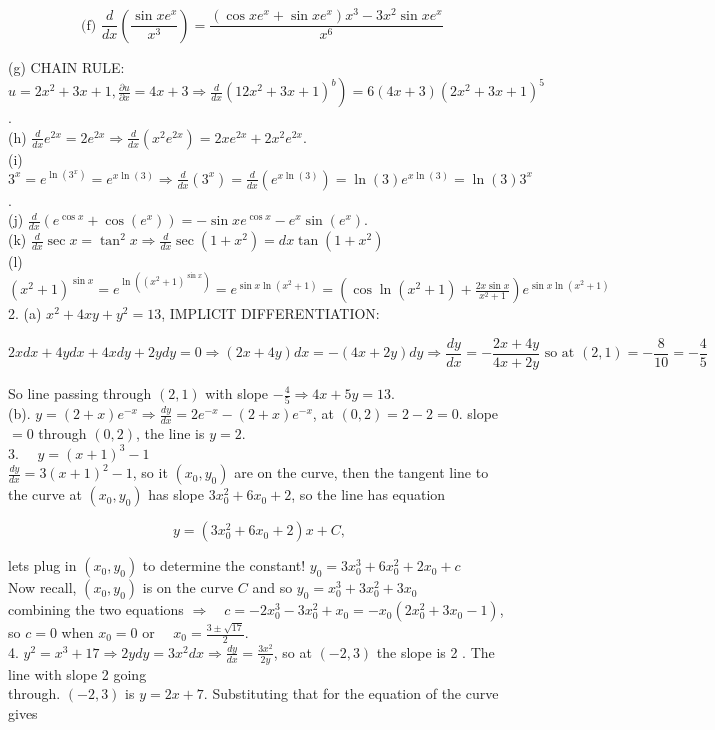 \documentclass[10pt]{article}
\begin{document}
$$
\text { (f) } \frac{d}{d x}\left(\frac{\sin x e^{x}}{x^{3}}\right)=\frac{\left(\cos x e^{x}+\sin x e^{x}\right) x^{3}-3 x^{2} \sin x e^{x}}{x^{6}}
$$

(g) CHAIN RULE: $\left.u=2 x^{2}+3 x+1, \frac{\partial u}{\partial x}=4 x+3 \Rightarrow \frac{d}{d x}\left(12 x^{2}+3 x+1\right)^{b}\right)=6(4 x+3)\left(2 x^{2}+3 x+1\right)^{5}$.\\
(h) $\frac{d}{d x} e^{2 x}=2 e^{2 x} \Rightarrow \frac{d}{d x}\left(x^{2} e^{2 x}\right)=2 x e^{2 x}+2 x^{2} e^{2 x}$.\\
(i) $3^{x}=e^{\ln \left(3^{x}\right)}=e^{x \ln (3)} \Rightarrow \frac{d}{d x}\left(3^{x}\right)=\frac{d}{d x}\left(e^{x \ln (3)}\right)=\ln (3) e^{x \ln (3)}=\ln (3) 3^{x}$.\\
(j) $\frac{d}{d x}\left(e^{\cos x}+\cos \left(e^{x}\right)\right)=-\sin x e^{\cos x}-e^{x} \sin \left(e^{x}\right)$.\\
(k) $\frac{d}{d x} \sec x=\tan ^{2} x \Rightarrow \frac{d}{d x} \sec \left(1+x^{2}\right)=d x \tan \left(1+x^{2}\right)$\\
(l) $\left(x^{2}+1\right)^{\sin x}=e^{\ln \left(\left(x^{2}+1\right)^{\sin x}\right)}=e^{\sin x \ln \left(x^{2}+1\right)}=\left(\cos \ln \left(x^{2}+1\right)+\frac{2 x \sin x}{x^{2}+1}\right) e^{\sin x \ln \left(x^{2}+1\right)}$\\
2. (a) $x^{2}+4 x y+y^{2}=13$, IMPLICIT DIFFERENTIATION:

$$
2 x d x+4 y d x+4 x d y+2 y d y=0 \Rightarrow(2 x+4 y) d x=-(4 x+2 y) d y \Rightarrow \frac{d y}{d x}=-\frac{2 x+4 y}{4 x+2 y} \text { so at }(2,1)=-\frac{8}{10}=-\frac{4}{5}
$$

So line passing through $(2,1)$ with slope $-\frac{4}{5} \Rightarrow 4 x+5 y=13$.\\
(b). $y=(2+x) e^{-x} \Rightarrow \frac{d y}{d x}=2 e^{-x}-(2+x) e^{-x}$, at $(0,2)=2-2=0$. slope $=0$ through $(0,2)$, the line is $y=2$.\\
3. $\quad y=(x+1)^{3}-1$\\
$\frac{d y}{d x}=3(x+1)^{2}-1$, so it $\left(x_{0}, y_{0}\right)$ are on the curve, then the tangent line to\\
the curve at $\left(x_{0}, y_{0}\right)$ has slope $3 x_{0}^{2}+6 x_{0}+2$, so the line has equation

$$
y=\left(3 x_{0}^{2}+6 x_{0}+2\right) x+C,
$$

lets plug in $\left(x_{0}, y_{0}\right)$ to determine the constant! $y_{0}=3 x_{0}^{3}+6 x_{0}^{2}+2 x_{0}+c$\\
Now recall, $\left(x_{0}, y_{0}\right)$ is on the curve $C$ and so $y_{0}=x_{0}^{3}+3 x_{0}^{2}+3 x_{0}$\\
combining the two equations $\Rightarrow \quad c=-2 x_{0}^{3}-3 x_{0}^{2}+x_{0}=-x_{0}\left(2 x_{0}^{2}+3 x_{0}-1\right)$, so $c=0$ when $x_{0}=0$ or $\quad x_{0}=\frac{3 \pm \sqrt{17}}{2}$.\\
4. $y^{2}=x^{3}+17 \Rightarrow 2 y d y=3 x^{2} d x \Rightarrow \frac{d y}{d x}=\frac{3 x^{2}}{2 y}$, so at $(-2,3)$ the slope is 2 . The line with slope 2 going\\
through. $(-2,3)$ is $y=2 x+7$. Substituting that for the equation of the curve gives
\end{document}
